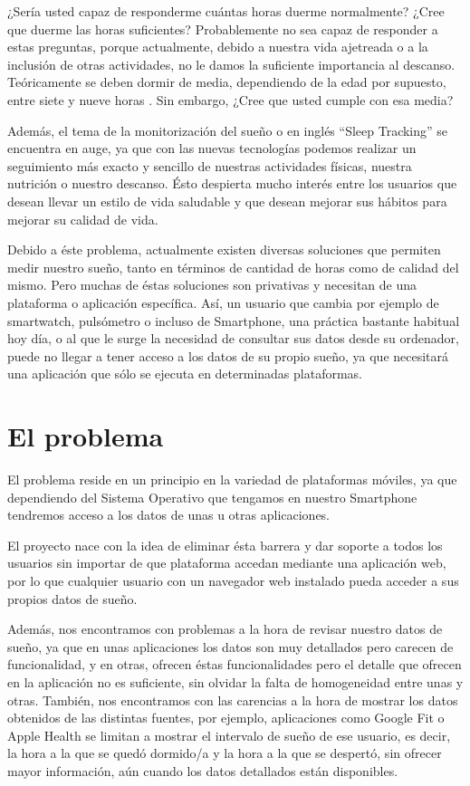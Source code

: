 \documentclass[11pt,openany]{book}
\begin{document}
¿Sería usted capaz de responderme cuántas horas duerme normalmente? ¿Cree que duerme las horas suficientes? Probablemente no sea capaz de responder a estas preguntas, porque actualmente, debido a nuestra vida ajetreada o a la inclusión de otras actividades, no le damos la suficiente importancia al descanso. Teóricamente se deben dormir de media, dependiendo de la edad por supuesto, entre siete y nueve horas \cite{1}. Sin embargo, ¿Cree que usted cumple con esa media?

Además, el tema de la monitorización del sueño o en inglés ``Sleep Tracking'' se encuentra en auge, ya que con las nuevas tecnologías podemos realizar un seguimiento más exacto y sencillo de nuestras actividades físicas, nuestra nutrición o nuestro descanso. Ésto despierta mucho interés entre los usuarios que desean llevar un estilo de vida saludable y que desean mejorar sus hábitos para mejorar su calidad de vida. 

Debido a éste problema, actualmente existen diversas soluciones que permiten medir nuestro sueño, tanto en términos de cantidad de horas como de calidad del mismo. Pero muchas de éstas soluciones son privativas y necesitan de una plataforma o aplicación específica. Así, un usuario que cambia por ejemplo de smartwatch, pulsómetro o incluso de Smartphone, una práctica bastante habitual hoy día, o al que le surge la necesidad de consultar sus datos desde su ordenador, puede no llegar a tener acceso a los datos de su propio sueño, ya que necesitará una aplicación que sólo se ejecuta en determinadas plataformas. 

\section{El problema}

El problema reside en un principio en la variedad de plataformas móviles, ya que dependiendo del Sistema Operativo que tengamos en nuestro Smartphone tendremos acceso a los datos de unas u otras aplicaciones. 

El proyecto nace con la idea de eliminar ésta barrera y dar soporte a todos los usuarios sin importar de que plataforma accedan mediante una aplicación web, por lo que cualquier usuario con un navegador web instalado pueda acceder a sus propios datos de sueño.

Además, nos encontramos con problemas a la hora de revisar nuestro datos de sueño, ya que en unas aplicaciones los datos son muy detallados pero carecen de funcionalidad, y en otras, ofrecen éstas funcionalidades pero el detalle que ofrecen en la aplicación no es suficiente, sin olvidar la falta de homogeneidad entre unas y otras. También, nos encontramos con las carencias a la hora de mostrar los datos obtenidos de las distintas fuentes, por ejemplo, aplicaciones como Google Fit o Apple Health se limitan a mostrar el intervalo de sueño de ese usuario, es decir, la hora a la que se quedó dormido/a y la hora a la que se despertó, sin ofrecer mayor información, aún cuando los datos detallados están disponibles.
\end{document}
